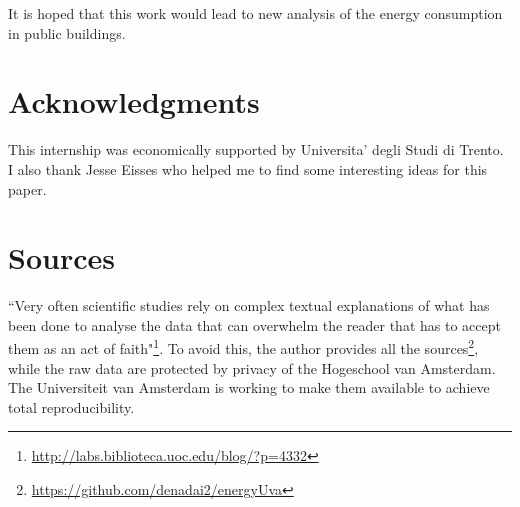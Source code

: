 \documentclass{sig-alternate-sigmod07}
\begin{document}
It is hoped that this work would lead to new analysis of the energy consumption in public buildings.



\section{Acknowledgments}
This internship was economically supported by Universita' degli Studi di Trento. I also thank Jesse Eisses who helped me to find some interesting ideas for this paper.

%

%
%
\appendix
\section{Sources}
``Very often scientific studies rely on complex textual explanations of what has been done to analyse the data that can overwhelm the reader that has to accept them as an act of faith"\footnote{\url{http://labs.biblioteca.uoc.edu/blog/?p=4332}}. To avoid this, the author provides all the sources\footnote{\url{https://github.com/denadai2/energyUva}}, while the raw data are protected by privacy of the Hogeschool van Amsterdam. The Universiteit van Amsterdam is working to make them available to achieve total reproducibility.


\balancecolumns %
\end{document}
